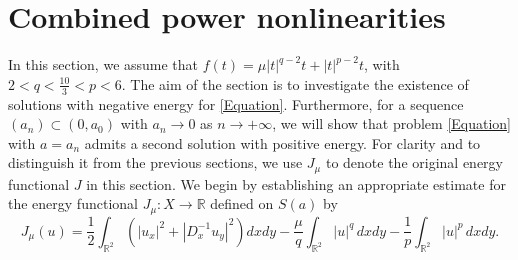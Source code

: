 \documentclass[11pt]{amsart}
\numberwithin{equation}{section}
\newcommand\R{\mathbb R}
\begin{document}
{{{  \section{{Combined power nonlinearities}}
  In this section, we assume that $f(t)=\mu|t|^{q-2}t+|t|^{p-2}t$, with {$2<q<\frac{10}{3}<p<6$}. {The aim of the section is to investigate the existence of  solutions with negative energy for \eqref{Equation}. Furthermore,  for a sequence $(a_n) \subset (0,a_0)$ with $a_n \to 0$ as $n \to+\infty$, we will show that problem \eqref{Equation} with $a=a_n$ admits a second solution with positive energy.}
  {For clarity and to distinguish it from the previous sections, we use \( J_\mu \) to denote the original energy functional \( J \) in this section.}
  We begin by establishing an appropriate estimate for the energy functional $J_\mu: X \rightarrow \R$ defined on ${S}(a)$ by
   \begin{equation*}
    J_{\mu}(u)=\frac{1}{2}\int_{\mathbb{R}^{2}} \left(|u_{x}|^{2} + |D^{-1}_{x} u_{y}|^{2} \right)dx dy-\frac{\mu}{q}\int_{\mathbb{R}^2} |u|^q \,dxdy-\frac{1}{p}\int_{\mathbb{R}^2} |u|^p \,dxdy.
  \end{equation*}
   }

}}
\end{document}
